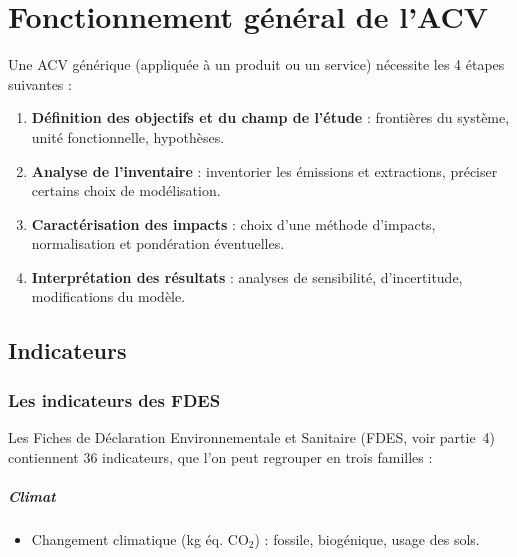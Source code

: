 \chapter{Fonctionnement général de l'ACV}
Une ACV générique (appliquée à un produit ou un service) nécessite les 4 étapes suivantes :
\begin{enumerate}
  \item \textbf{Définition des objectifs et du champ de l'étude} : frontières du système, unité fonctionnelle, hypothèses.
  \item \textbf{Analyse de l'inventaire} : inventorier les émissions et extractions, préciser certains choix de modélisation.
  \item \textbf{Caractérisation des impacts} : choix d'une méthode d'impacts, normalisation et pondération éventuelles.
  \item \textbf{Interprétation des résultats} : analyses de sensibilité, d'incertitude, modifications du modèle.
\end{enumerate}


\section{Indicateurs}

\subsection*{Les indicateurs des FDES}

Les Fiches de Déclaration Environnementale et Sanitaire (FDES, voir partie~4) contiennent 36 indicateurs, que l'on peut regrouper en trois familles :

\paragraph{Climat}
\begin{itemize}
  \item Changement climatique (kg éq. CO$_2$) : fossile, biogénique, usage des sols.
\end{itemize}

